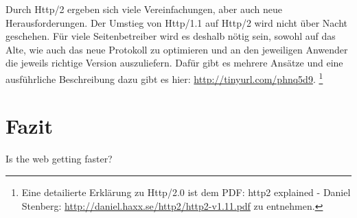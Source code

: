 			Durch Http/2 ergeben sich viele Vereinfachungen, aber auch neue Herausforderungen. Der Umstieg von Http/1.1 auf Http/2 wird nicht über Nacht geschehen. Für viele Seitenbetreiber wird es deshalb nötig sein, sowohl auf das Alte, wie auch das neue Protokoll zu optimieren und an den jeweiligen Anwender die jeweils richtige Version auszuliefern. Dafür gibt es mehrere Ansätze und eine ausführliche Beschreibung dazu gibt es hier: \url{http://tinyurl.com/phnq5d9}. \footnote{Eine detailierte Erklärung zu Http/2.0 ist dem PDF: http2 explained - Daniel Stenberg: \url{http://daniel.haxx.se/http2/http2-v1.11.pdf} zu entnehmen.}



\pagebreak
%
%


\section{Fazit} %
\label{sec:fazit}
	Is the web getting faster?


